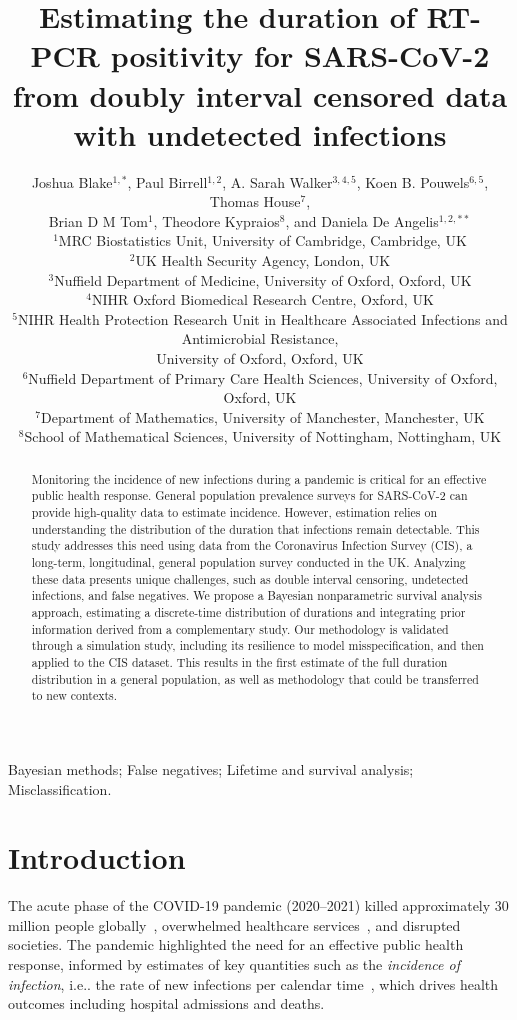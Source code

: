 \documentclass[referee,useAMS,usenatbib]{biom}
\title[Estimating duration]{Estimating the duration of RT-PCR positivity for SARS-CoV-2 from doubly interval censored data with undetected infections}
\author{Joshua Blake$^{1,*}$\email{joshua.blake@mrc-bsu.cam.ac.uk},
Paul Birrell$^{1,2}$,
A. Sarah Walker$^{3,4,5}$,
Koen B. Pouwels$^{6,5}$,
Thomas House$^{7}$, \\
Brian D M Tom$^{1}$,
Theodore Kypraios$^{8}$, and
Daniela De Angelis$^{1,2,**}$\email{daniela.deangelis@mrc-bsu.cam.ac.uk} \\
$^{1}$MRC Biostatistics Unit, University of Cambridge, Cambridge, UK \\
$^{2}$UK Health Security Agency, London, UK \\
$^{3}$Nuffield Department of Medicine, University of Oxford, Oxford, UK \\
$^{4}$NIHR Oxford Biomedical Research Centre, Oxford, UK \\
$^{5}$NIHR Health Protection Research Unit in Healthcare Associated Infections and Antimicrobial Resistance, \\ University of Oxford, Oxford, UK \\
$^{6}$Nuffield Department of Primary Care Health Sciences, University of Oxford, Oxford, UK \\
$^{7}$Department of Mathematics, University of Manchester, Manchester, UK \\
$^{8}$School of Mathematical Sciences, University of Nottingham, Nottingham, UK}
\makeatletter
\DeclareRobustCommand\onedot{\futurelet\@let@token\@onedot}
\def\@onedot{\ifx\@let@token.\else.\null\fi\xspace}
\def\ie{i.e\onedot} \def\Ie{{I.e}\onedot}
\makeatother
\begin{document}
\pagerange{\pageref{firstpage}--\pageref{lastpage}} 

\label{firstpage}

\begin{abstract}
Monitoring the incidence of new infections during a pandemic is critical for an effective public health response. General population prevalence surveys for SARS-CoV-2 can provide high-quality data to estimate incidence.  However, estimation relies on understanding the distribution of the duration that infections remain detectable. This study addresses this need using data from the Coronavirus Infection Survey (CIS), a long-term, longitudinal, general population survey conducted in the UK. Analyzing these data presents unique challenges, such as double interval censoring, undetected infections, and false negatives. We propose a Bayesian nonparametric survival analysis approach, estimating a discrete-time distribution of durations and integrating prior information derived from a complementary study. Our methodology is validated through a simulation study, including its resilience to model misspecification, and then applied to the CIS dataset. This results in the first estimate of the full duration distribution in a general population, as well as methodology that could be transferred to new contexts.
\end{abstract}

\begin{keywords}  Bayesian methods; False negatives; Lifetime and survival analysis; Misclassification. \end{keywords}

\maketitle


\section{Introduction} \label{sec:intro}

The acute phase of the COVID-19 pandemic (2020--2021) killed approximately 30 million people globally~\citep{whoCOVIDExcess}, overwhelmed healthcare services~\citep{fongNHS}, and disrupted societies.
The pandemic highlighted the need for an effective public health response, informed by estimates of key quantities such as the \emph{incidence of infection}, \ie the rate of new infections per calendar time~\citep{freemanPrevalence}, which drives health outcomes including hospital admissions and deaths. 
\end{document}
